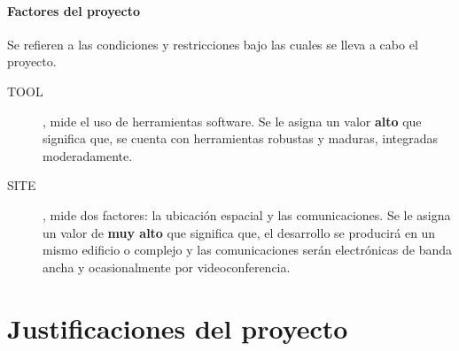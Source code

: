 \documentclass[11pt,a4paper,spanish,twoside]{book}
\begin{document}
\subsubsection{Factores del proyecto}
Se refieren a las condiciones y restricciones bajo las cuales se lleva a cabo
el proyecto.
\begin{description}
\item[TOOL], mide el uso de herramientas software. Se le asigna un valor
\textbf{alto} que significa que, se cuenta con herramientas robustas y
maduras, integradas moderadamente.
\item[SITE], mide dos factores: la ubicación espacial y las comunicaciones.
Se le asigna un valor de \textbf{muy alto} que significa que, el desarrollo
se producirá en un mismo edificio o complejo y las comunicaciones serán
electrónicas de banda ancha y ocasionalmente por videoconferencia.
\end{description}

\chapter{Justificaciones del proyecto}
\end{document}
